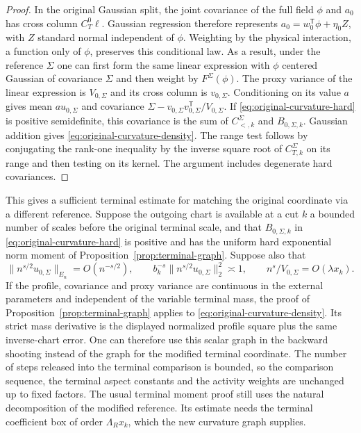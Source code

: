 \documentclass[11pt]{article}
\theoremstyle{definition}
\begin{document}
\begin{proof}
In the original Gaussian split, the joint covariance of the
full field \(\phi\) and \(a_0\) has cross column
\(C^0_T\ell\). Gaussian regression therefore represents
\(a_0=w_0^{\mathsf T}\phi+\eta_0 Z\), with \(Z\) standard
normal independent of \(\phi\). Weighting by the physical
interaction, a function only of \(\phi\), preserves this
conditional law. As a result, under the reference \(\Sigma\)
one can first form the same linear expression with
\(\phi\) centered Gaussian of covariance \(\Sigma\) and then
weight by \(F^\Sigma(\phi)\). The proxy variance of the
linear expression is \(V_{0,\Sigma}\) and its cross column
is \(v_{0,\Sigma}\). Conditioning on its value \(a\)
gives mean \(a u_{0,\Sigma}\) and covariance
\(\Sigma-v_{0,\Sigma}v_{0,\Sigma}^{\mathsf T}/V_{0,\Sigma}\).
If \eqref{eq:original-curvature-hard} is positive semidefinite,
this covariance is the sum of \(C^\Sigma_{<,k}\) and
\(B_{0,\Sigma,k}\). Gaussian addition gives
\eqref{eq:original-curvature-density}. The range test follows
by conjugating the rank-one inequality by the inverse square
root of \(C^\Sigma_{T,k}\) on its range and then testing on its
kernel. The argument includes degenerate hard covariances.
\end{proof}

This gives a sufficient terminal estimate for matching the
original coordinate via a different reference. Suppose the
outgoing chart is available at a cut \(k\) a bounded number
of scales before the original terminal scale, and that
\(B_{0,\Sigma,k}\) in \eqref{eq:original-curvature-hard} is
positive and has the uniform hard exponential norm moment of
Proposition~\ref{prop:terminal-graph}. Suppose also that
\begin{equation}
 \|n^{s/2}u_{0,\Sigma}\|_{E_n}=O(n^{-s/2}),\qquad
 b_k^{-s}\|n^{s/2}u_{0,\Sigma}\|_2^2\asymp1,\qquad
 n^s/V_{0,\Sigma}=O(\lambda x_k).
\end{equation}
If the profile, covariance and proxy variance are continuous
in the external parameters and independent of the variable
terminal mass, the proof of Proposition~\ref{prop:terminal-graph}
applies to \eqref{eq:original-curvature-density}. Its strict
mass derivative is the displayed normalized profile square
plus the same inverse-chart error. One can therefore use this
scalar graph in the backward shooting instead of the graph
for the modified terminal coordinate. The number of steps
released into the terminal comparison is bounded, so the
comparison sequence, the terminal aspect constants and the
activity weights are unchanged up to fixed factors. The usual
terminal moment proof still uses the natural decomposition of
the modified reference. Its estimate needs the terminal
coefficient box of order \(\Lambda_R x_k\), which the new
curvature graph supplies.
\end{document}
